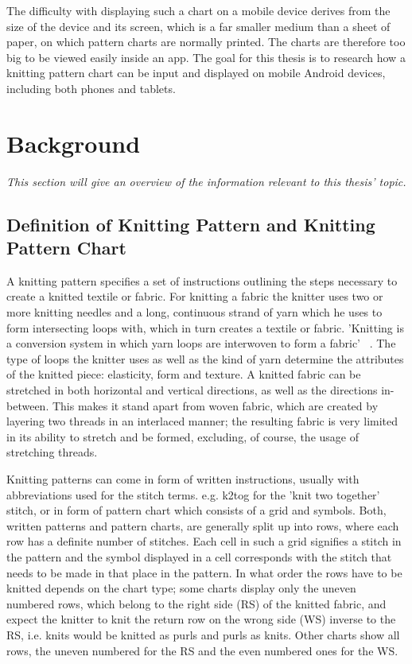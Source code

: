 \documentclass[a4paper,11pt]{kth-mag}
\begin{document}
The difficulty with displaying such a chart on a mobile device derives from the
size of the device and its screen, which is a far smaller medium than a sheet of
paper, on which pattern charts are normally printed. The charts are therefore too
big to be viewed easily inside an app. The goal for this thesis is to research
how a knitting pattern chart can be input and displayed on mobile Android
devices, including both phones and tablets.

\chapter{Background}
\textit{This section will give an overview of the information relevant to this
thesis’ topic.}

\section{Definition of Knitting Pattern and Knitting Pattern Chart}
A knitting pattern specifies a set of instructions outlining the steps necessary
to create a knitted textile or fabric. For knitting a fabric the knitter uses
two or more knitting needles and a long, continuous strand of yarn which he uses
to form intersecting loops with, which in turn creates a textile or fabric.
'Knitting is a conversion system in which yarn loops are interwoven to form a
fabric' ~\cite[p17]{raz1993}. The type of loops the knitter uses as well as the kind
of yarn determine the attributes of the knitted piece: elasticity, form and
texture. A knitted fabric can be stretched in both horizontal and vertical
directions, as well as the directions in-between. This makes it stand apart
from woven fabric, which are created by layering two threads in an interlaced
manner; the resulting fabric is very limited in its ability to stretch and be
formed, excluding, of course, the usage of stretching threads.

Knitting patterns can come in form of written instructions, usually with
abbreviations used for the stitch terms. e.g. k2tog for the 'knit two together'
stitch, or in form of pattern chart which consists of a grid and symbols. Both,
written patterns and pattern charts, are generally split up into rows, where
each row has a definite number of stitches. Each cell in such a grid signifies a
stitch in the pattern and the symbol displayed in a cell corresponds with the
stitch that needs to be made in that place in the pattern. In what order the
rows have to be knitted depends on the chart type; some charts display only the
uneven numbered rows, which belong to the right side (RS) of the knitted fabric,
and expect the knitter to knit the return row on the wrong side (WS) inverse to
the RS, i.e. knits would be knitted as purls and purls as knits. Other charts
show all rows, the uneven numbered for the RS and the even numbered ones for the
 WS.
\end{document}
